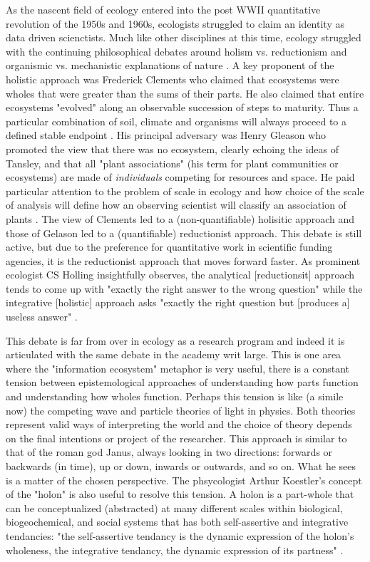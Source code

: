 As the nascent field of ecology entered into the post WWII quantitative revolution of the 1950s and 1960s, ecologists struggled to claim an identity as data driven scienctists. Much like other disciplines at this time, ecology struggled with the continuing philosophical debates around holism vs. reductionism and organismic vs. mechanistic explanations of nature \cite{barbour_1996}. A key proponent of the holistic approach was Frederick Clements who claimed that ecosystems were wholes that were greater than the sums of their parts. He also claimed that entire ecosystems "evolved" along an observable succession of steps to maturity. Thus a particular combination of soil, climate and organisms will always proceed to a defined stable endpoint \cite{clements_1936}. His principal adversary was Henry Gleason who promoted the view that there was no ecosystem, clearly echoing the ideas of Tansley, and that all "plant associations" (his term for plant communities or ecosystems) are made of \textit{individuals} competing for resources and space. He paid particular attention to the problem of scale in ecology and how choice of the scale of analysis will define how an observing scientist will classify an association of plants \cite{gleason_1939}. The view of Clements led to a (non-quantifiable) holisitic approach and those of Gelason led to a (quantifiable) reductionist approach. This debate is still active, but due to the preference for quantitative work in scientific funding agencies, it is the reductionist approach that moves forward faster. As prominent ecologist CS Holling insightfully observes, the analytical [reductionsit] approach tends to come up with "exactly the right answer to the wrong question" while the integrative [holistic] approach asks "exactly the right question but [produces a] useless answer" \cite[][p. 3]{holling_1998}.

This debate is far from over in ecology as a research program and indeed it is articulated with the same debate in the academy writ large. This is one area where the "information ecosystem" metaphor is very useful, there is a constant tension between epistemological approaches of understanding how  parts function and understanding how wholes function. Perhaps this tension is like (a simile now) the competing wave and particle theories of light in physics. Both theories represent valid ways of interpreting the world and the choice of theory depends on the final intentions or project of the researcher. This approach is similar to that of the roman god Janus, always looking in two directions: forwards or backwards (in time), up or down, inwards or outwards, and so on. What he sees is a matter of the chosen perspective. The phsycologist Arthur Koestler's concept of the "holon" is also useful to resolve this tension. A holon is a part-whole that can be conceptualized (abstracted) at many different scales within biological, biogeochemical, and social systems that has both self-assertive and integrative tendancies: "the self-assertive tendancy is the dynamic expression of the holon's wholeness, the integrative tendancy, the dynamic expression of its partness" \cite[][p. 56] {koestler_1967}.

